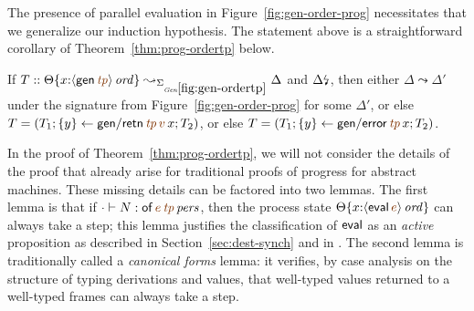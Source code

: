 The presence of parallel evaluation in Figure~\ref{fig:gen-order-prog}
necessitates that we generalize our induction hypothesis. The
statement above is a straightforward corollary of
Theorem~\ref{thm:prog-ordertp} below.

\bigskip
\begin{theorem}\label{thm:prog-ordertp}
If $T :: \tackon{\Theta}{x{:}\istrue{\susp{{\sf gen}\,\lf{{\it tp}}}}}
\leadsto_{\siggenordertp} \Delta$ and ${\Delta}{\mbox{\lightning}}_{}$, then
either $\Delta \leadsto \Delta'$ under the signature from 
Figure~\ref{fig:gen-order-prog} for some $\Delta'$, or else 
$T = \left(T_1; \trstep{y}{{\sf gen/retn}\,\lf{{\it tp}}\,\lf{v}\,x}; T_2\right)$, or else 
$T = \left(T_1; \trstep{y}{{\sf gen/error}\,\lf{{\it tp}}\,x}; T_2\right)$.
\end{theorem}

\bigskip

In the proof of Theorem~\ref{thm:prog-ordertp}, we will not consider
the details of the proof that already arise for traditional proofs of
progress for abstract machines. These missing details can be factored
into two lemmas. The first lemma is that if $\cdot \vdash N :
\ispers{{\sf of}\,\lf{e}\,\lf{{\it tp}}}$, then the process state
$\tackon{\Theta}{x{:}\istrue{\susp{{\sf eval}\,\lf{e}}}}$ can always
take a step; this lemma justifies the classification of ${\sf eval}$
as an {\it active} proposition as described in
Section~\ref{sec:dest-synch} and in
\cite{pfenning09substructural}. The second lemma is traditionally
called a {\it canonical forms} lemma: it verifies, by case analysis on
the structure of typing derivations and values, that well-typed
values returned to a well-typed frames can always take a step.


